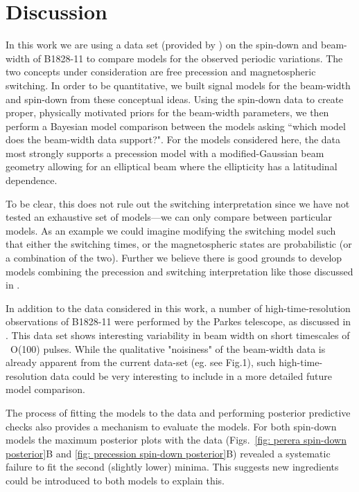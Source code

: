 \documentclass[../full_thesis/full_thesis.tex]{subfiles}
\begin{document}
\section{Discussion}
\label{sec: discussion}

In this work we are using a data set (provided by \citet{Lyne2010}) on the
spin-down and beam-width of B1828-11 to compare models for the observed
periodic variations.  The two concepts under consideration are free precession
and magnetospheric switching.  In order to be quantitative, we built signal
models for the beam-width and spin-down from these conceptual ideas. Using the
spin-down data to create proper, physically motivated priors for the beam-width
parameters, we then perform a Bayesian model comparison between the models
asking ``which model does the beam-width data support?". For the models
considered here, the data most strongly supports a precession model with a
modified-Gaussian beam geometry allowing for an elliptical beam where the
ellipticity has a latitudinal dependence.

To be clear, this does not rule out the switching interpretation since we have
not tested an exhaustive set of models---we can only compare between particular
models. As an example we could imagine modifying the switching model such that
either the switching times, or the magnetospheric states are probabilistic (or
a combination of the two).  Further we believe there is good grounds to develop
models combining the precession and switching interpretation like those
discussed in \citet{Jones2012}.

In addition to the data considered in this work, a number of
high-time-resolution observations of B1828-11 were performed
by the Parkes telescope, as discussed in \citet{Stairs2003}.
This data set shows interesting variability in beam width on short
timescales of ~O(100) pulses. While the qualitative "noisiness" of the
beam-width data is already apparent from the current data-set (eg. see
Fig.1), such high-time-resolution data could be very interesting to
include in a more detailed future model comparison.

The process of fitting the models to the data and performing posterior
predictive checks also provides a mechanism to evaluate the models. For both
spin-down models the maximum posterior plots with the data (Figs.~\ref{fig:
perera spin-down posterior}B and \ref{fig: precession spin-down posterior}B)
revealed a systematic failure to fit the second (slightly lower) minima. This
suggests new ingredients could be introduced to both models to explain this.
\end{document}
